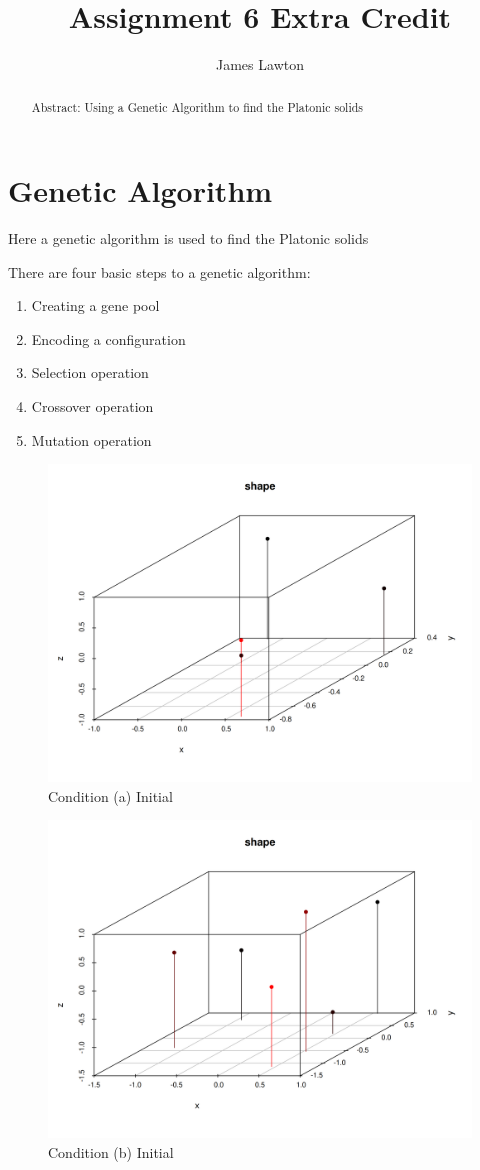 \documentclass[prb,twocolumn]{revtex4-2}
\begin{document}
\title{Assignment 6 Extra Credit}

\author{James Lawton}


\begin{abstract}
Abstract: Using a Genetic Algorithm to find the Platonic solids
\end{abstract}

\maketitle

\section{Genetic Algorithm}

\noindent

Here a genetic algorithm is used to find the Platonic solids

There are four basic steps to a genetic algorithm:

\begin{enumerate}
    \item Creating a gene pool
    \item Encoding a configuration
    \item Selection operation
    \item Crossover operation
    \item Mutation operation
\end{enumerate}

\begin{figure}[H]
    \centerline{\includegraphics [width=3 in] {img/tetra.png}}
    \caption{Condition (a) Initial} \label{q1}
\end{figure}

\begin{figure}[H]
    \centerline{\includegraphics [width=3 in] {img/octa.png}}
    \caption{Condition (b) Initial} \label{q1}
\end{figure}
\end{document}
